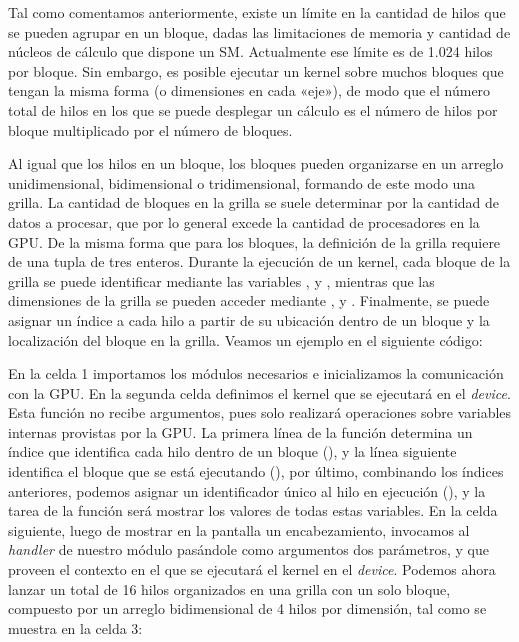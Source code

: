 Tal como comentamos anteriormente, existe un límite en la cantidad de hilos que se pueden agrupar en un bloque, dadas las limitaciones de memoria y cantidad de núcleos de cálculo que dispone un SM. Actualmente ese límite es de 1.024 hilos por bloque. Sin embargo, es posible ejecutar un kernel sobre muchos bloques que tengan la misma forma (o dimensiones en cada «eje»), de modo que el número total de hilos en los que se puede desplegar un cálculo es el número de hilos por bloque multiplicado por el número de bloques.

Al igual que los hilos en un bloque, los bloques pueden organizarse en un arreglo unidimensional, bidimensional o tridimensional, formando de este modo una grilla. La cantidad de bloques en la grilla se suele determinar por la cantidad de datos a procesar, que por lo general excede la cantidad de procesadores en la GPU. De la misma forma que para los bloques, la definición de la grilla requiere de una tupla de tres enteros. Durante la ejecución de un kernel, cada bloque de la grilla se puede identificar mediante las variables ,  y , mientras que las dimensiones de la grilla se pueden acceder mediante ,  y . Finalmente, se puede asignar un índice a cada hilo a partir de su ubicación dentro de un bloque y la localización del bloque en la grilla. Veamos un ejemplo en el siguiente código:


En la celda 1 importamos los módulos necesarios e inicializamos la comunicación con la GPU. En la segunda celda definimos el kernel que se ejecutará en el \textit{device}. Esta función no recibe argumentos, pues solo realizará operaciones sobre variables internas provistas por la GPU. La primera línea de la función determina un índice que identifica cada hilo dentro de un bloque (), y la línea siguiente identifica el bloque que se está ejecutando (), por último, combinando los índices anteriores, podemos asignar un identificador único al hilo en ejecución (), y la tarea de la función será mostrar los valores de todas estas variables. En la celda siguiente, luego de mostrar en la pantalla un encabezamiento, invocamos al \textit{handler} de nuestro módulo pasándole como argumentos dos parámetros,  y  que proveen el contexto en el que se ejecutará el kernel en el \textit{device}. Podemos ahora lanzar un total de 16 hilos organizados en una grilla con un solo bloque, compuesto por un arreglo bidimensional de 4 hilos por dimensión, tal como se muestra en la celda 3:

